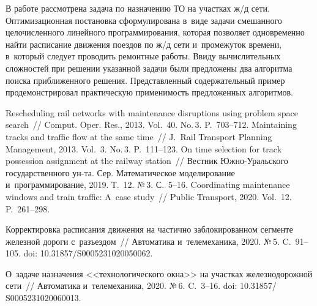 \begin{multicols}{2}
  В работе рассмотрена задача по назначению ТО на участках ж/д сети. 
Оптимизационная постановка сформулирована в~виде задачи смешанного 
целочисленного линейного программирования, которая
 позволяет одновременно 
найти расписание движения поездов по ж/д сети и~промежуток времени, 
в~который следует проводить ремонтные работы. Ввиду вычислительных 
сложностей при решении указанной задачи были предложены два алгоритма 
поиска приближенного решения. Представленный содержательный пример 
продемонстрировал практическую применимость предложенных алгоритмов.

\vspace*{-6pt}

{\small\frenchspacing
{%
\begin{thebibliography}{99}

\vspace*{-2pt}

 Rescheduling rail networks with maintenance 
disruptions using problem space search~// Comput. Oper. Res., 2013. Vol.~40. No.\,3. P.~703--712.
 Maintaining tracks and traffic flow at the same time~// 
J.~Rail Transport Planning  Management, 2013. Vol.~3. No.\,3. P.~111--123.
 On time selection for track possession assignment at the railway 
station~// Вестник Юж\-но-Ураль\-ско\-го государственного ун-та.
Сер. Математическое моделирование и~программирование, 2019. Т.~12. №\,3. С.~5--16.
 Coordinating maintenance windows and train traffic: A~case study~// Public Transport, 
2020. Vol.~12. P.~261--298.

Корректировка расписания движения на частично заблокированном сегменте железной дороги с~разъездом~// 
 Автоматика и~телемеханика, 2020. %
 №\,5. C.~91--105.
 doi: 10.31857/S0005231020050062.



О~задаче назначения <<технологического окна>> на участках железнодорожной сети~// 
 Автоматика и~телемеханика, 2020. %
№\,6. C.~3--16. doi: 10.31857/ S0005231020060013.



\end{thebibliography}}}
\end{multicols}
